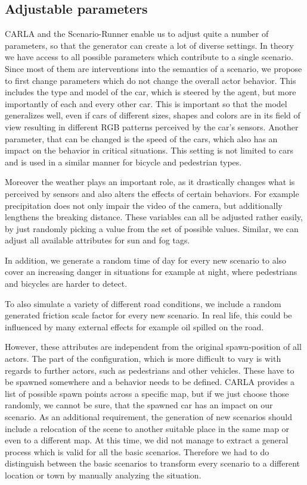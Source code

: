 \documentclass[conference, a4paper, 11pt]{IEEEtran}
\begin{document}
	\subsection{Adjustable parameters}
	
	CARLA and the Scenario-Runner enable us to adjust quite a number of parameters, so that the generator can create a lot of diverse settings. In theory we have access to all possible parameters which contribute to a single scenario. Since most of them are interventions into the semantics of a scenario, we propose to first change parameters which do not change the overall actor behavior.
	This includes the type and model of the car, which is steered by the agent, but more importantly of each and every other car.
	This is important so that the model generalizes well, even if cars of different sizes, shapes and colors are in its field of view resulting in different RGB patterns perceived by the car's sensors.
	Another parameter, that can be changed is the speed of the cars, which also has an impact on the behavior in critical situations.
	This setting is not limited to cars and is used in a similar manner for bicycle and pedestrian types.
	
	Moreover the weather plays an important role, as it drastically changes what is perceived by sensors and also alters the effects of certain behaviors. For example precipitation does not only impair the video of the camera, but additionally lengthens the breaking distance.
	These variables can all be adjusted rather easily, by just randomly picking a value from the set of possible values.
	Similar, we can adjust all available attributes for sun and fog tags.
	
	In addition, we generate a random time of day for every new scenario to also cover an increasing danger in situations for example at night, where pedestrians and bicycles are harder to detect.
	
	To also simulate a variety of different road conditions, we include a random generated friction scale factor for every new scenario. In real life, this could be influenced by many external effects for example oil spilled on the road.
	
	However, these attributes are independent from the original spawn-position of all actors. 
	The part of the configuration, which is more difficult to vary is with regards to further actors, such as pedestrians and other vehicles. These have to be spawned somewhere and a behavior needs to be defined.
	CARLA provides a list of possible spawn points across a specific map, but if we just choose those randomly, we cannot be sure, that the spawned car has an impact on our scenario.
	As an additional requirement, the generation of new scenarios should include a relocation of the scene to another suitable place in the same map or even to a different map.
	At this time, we did not manage to extract a general process which is valid for all the basic scenarios. Therefore we had to do distinguish between the basic scenarios to transform every scenario to a different location or town by manually analyzing the situation.
	
\end{document}
